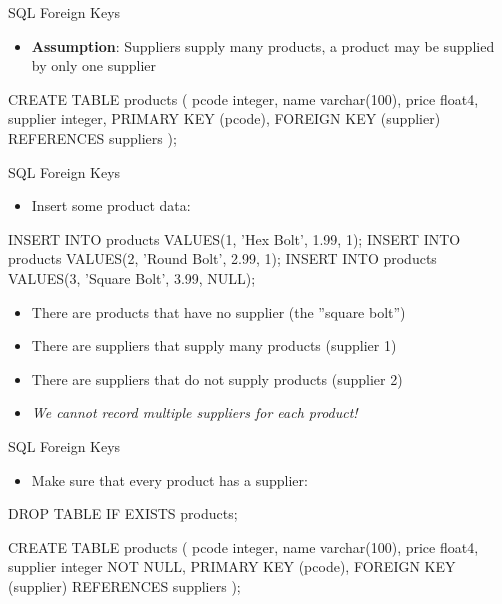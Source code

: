 \documentclass[ignorenonframetext,xcolor=x11names]{beamer}
\begin{document}
\begin{frame}[label=full,fragile]{SQL Foreign Keys}
\begin{itemize}
  \item \textbf{Assumption}: Suppliers supply many products, a product may be supplied by only one supplier
\end{itemize}
\footnotesize
\begin{sqlcode}
CREATE TABLE products (
  pcode    integer,
  name     varchar(100),
  price    float4,
  supplier integer,
  PRIMARY KEY (pcode),
  FOREIGN KEY (supplier) REFERENCES suppliers );
\end{sqlcode}
\end{frame}

\begin{frame}[label=full,fragile]{SQL Foreign Keys}
\begin{itemize}
  \item Insert some product data:
\end{itemize}
\footnotesize
\begin{sqlcode}
INSERT INTO products VALUES(1, 'Hex Bolt', 1.99, 1);
INSERT INTO products VALUES(2, 'Round Bolt', 2.99, 1);
INSERT INTO products 
    VALUES(3, 'Square Bolt', 3.99, NULL);
\end{sqlcode}
\normalsize
\begin{itemize}
  \item There are products that have no supplier (the ''square bolt'')
  \item There are suppliers that supply many products (supplier 1)
  \item There are suppliers that do not supply products (supplier 2)
  \item \emph{We cannot record multiple suppliers for each product!}
\end{itemize}
\end{frame}

\begin{frame}[label=full,fragile]{SQL Foreign Keys}
\begin{itemize}
  \item Make sure that every product has a supplier:
\end{itemize}
\footnotesize
\begin{sqlcode}
DROP TABLE IF EXISTS products;

CREATE TABLE products (
  pcode    integer,
  name     varchar(100),
  price    float4,
  supplier integer NOT NULL,
  PRIMARY KEY (pcode),
  FOREIGN KEY (supplier) REFERENCES suppliers );
\end{sqlcode}
\end{frame}
\end{document}
